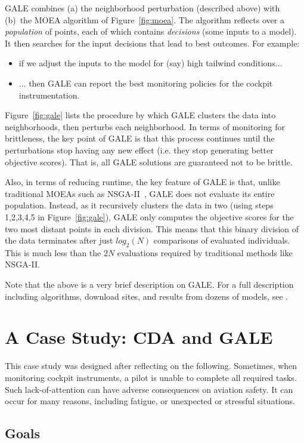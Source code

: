 \documentclass[journal]{IEEEtran}
\newcommand{\fig}[1]{Figure~\ref{fig:#1}}
\begin{document}
GALE combines (a) the neighborhood perturbation (described above) with (b)~the MOEA algorithm of \fig{moea}.
The algorithm reflects over a {\em population} of points, each of which contains {\em decisions} (some inputs to a  model).
It then searches for the input decisions that lead to best outcomes.
For example:
\begin{itemize}
\item
if we adjust the inputs to the model for (say) high tailwind conditions...
\item
... then GALE can report the best monitoring policies for the cockpit instrumentation.
\end{itemize}

\fig{gale} lists the procedure by which GALE clusters the data into neighborhoods, then perturbs each neighborhood.
In terms of monitoring for brittleness, the key point of GALE is that  this process continues until the perturbations stop having any new effect (i.e. they stop generating better objective scores). 
That is, all GALE solutions are guaranteed not to be brittle.


Also, in terms of reducing runtime, the key feature of GALE is that, unlike traditional MOEAs such as NSGA-II~\cite{deb00afast}, GALE does not evaluate its entire population.
Instead, as it recursively clusters the data in two (using steps 1,2,3,4,5 in \fig{gale}), GALE only computes the objective scores for the two most distant points in each division.  
This means that this binary division of the data terminates after just $log_2(N)$ comparisons of evaluated individuals. 
This is much less than the $2N$ evaluations required by  traditional methods like NSGA-II.

Note that the above is a very brief description on GALE. For a full description including algorithms, download sites, and results
from dozens of models, see \cite{galepaper,krallphd}.

\section{A Case Study:  CDA and GALE}\label{sec:case}

This case study was designed after reflecting on the following.
Sometimes, when monitoring cockpit instruments, a pilot is unable to complete all required tasks.
Such lack-of-attention can have adverse consequences on aviation safety.
It can occur for many reasons, including fatigue, or
 unexpected or stressful situations.
\subsection{Goals}
\end{document}
